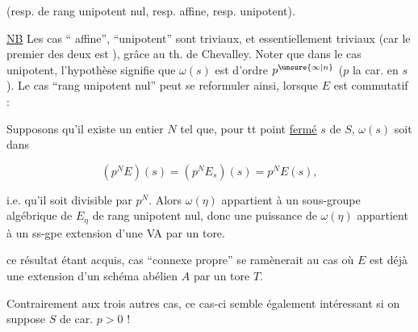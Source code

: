 
(resp. de rang unipotent nul, resp. affine, resp. unipotent).

\uline{NB} Les cas `` affine'', ``unipotent'' sont triviaux, et essentiellement triviaux  (car le premier des deux est ), grâce au th. de Chevalley. Noter que dans le cas unipotent, l'hypothèse signifie que $\omega(s)$ est d'ordre $p^{\unsure{\infty|n}}$ ($p$ la car. en $s$). Le cas  ``rang unipotent nul'' peut se reformuler ainsi, lorsque $E$ est commutatif :


Supposons qu'il existe un entier $N$ tel que, pour tt point \uline{fermé} $s$ de $S$, $\omega(s)$ soit  dans

\[
(p^NE)(s)=(p^NE_s)(s)=p^NE(s),
\]

i.e. qu'il soit divisible par $p^N$. Alors $\omega(\eta)$ appartient à un sous-groupe algébrique de $E_{\eta}$ de rang  unipotent nul, donc une puissance de $\omega(\eta)$ appartient à un ss-gpe extension d'une VA par un tore.



 ce résultat étant acquis,   cas ``connexe propre'' se ramènerait au cas où $E$ est déjà une extension d'un schéma abélien $A$ par un tore $T$.

 Contrairement aux trois autres cas, ce cas-ci semble également intéressant si on suppose $S$ de car. $p>0$  !

